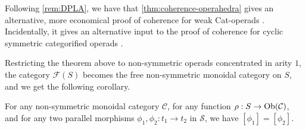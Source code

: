 Following \cref{rem:DPLA}, we have that \cref{thm:coherence-operahedra} gives an alternative, more economical proof of coherence for weak Cat-operads \cite[Prop.~14.2]{DP15}.
Incidentally, it gives an alternative input to the proof of coherence for cyclic symmetric categorified operads \cite{curienCategorifiedCyclicOperads2020}.

Restricting the theorem above to non-symmetric operads concentrated in arity $1$, the category $\mathcal{F}(S)$ becomes the free non-symmetric monoidal category on $S$, and we get the following corollary. 

\begin{corollary}
\label{cor:MacLane}
    For any non-symmetric monoidal category $\mathcal{C}$, for any function $\rho : S \to \mathrm{Ob}(\mathcal{C})$, and for any two parallel morphisms $\phi_1,\phi_2: t_1 \to t_2$ in $\mathcal{S}$, we have $[\phi_1]=[\phi_2]$.
\end{corollary}

\begin{rem}
\end{rem}




